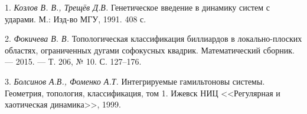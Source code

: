 \litlist

1. {\it  Козлов В. В., Трещёв Д.В.} Генетическое введение в динамику систем с ударами. М.:  Изд-во МГУ, 1991. 408 с.

2. {\it Фокичева В. В.} Топологическая классификация биллиардов в локально-плоских областях, ограниченных дугами софокусных квадрик. Математический сборник. — 2015. — Т. 206, № 10. С. 127–176.

3. {\it Болсинов А.В., Фоменко А.Т.} Интегрируемые гамильтоновы системы. Геометрия, топология, классификация, том 1. Ижевск НИЦ <<Регулярная и хаотическая динамика>>, 1999.

